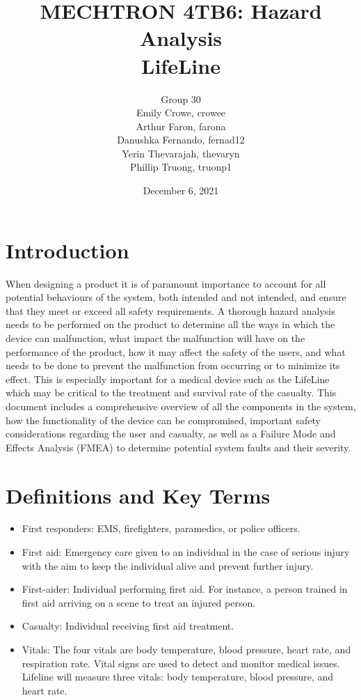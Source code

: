 \documentclass{article}
\title{MECHTRON 4TB6: Hazard Analysis \\ LifeLine}
\author{Group 30 \\ Emily Crowe, crowee \\ Arthur Faron, farona \\ Danushka Fernando, fernad12 \\Yerin Thevarajah, thevaryn \\ Phillip Truong, truonp1}
\begin{document}
\renewcommand{\labelenumii}{\arabic{enumi}.\arabic{enumii}}
\renewcommand{\labelenumiii}{\arabic{enumi}.\arabic{enumii}.\arabic{enumiii}}
\renewcommand{\labelenumiv}{\arabic{enumi}.\arabic{enumii}.\arabic{enumiii}.\arabic{enumiv}}

    \date{December 6, 2021}
	\maketitle
	
	\newpage
    
	\tableofcontents

	\newpage

	\section{Introduction}
	When designing a product it is of paramount importance to account for all potential behaviours of the system, both intended and not intended, and ensure that they meet or exceed all safety requirements. A thorough hazard analysis needs to be performed on the product to determine all the ways in which the device can malfunction, what impact the malfunction will have on the performance of the product, how it may affect the safety of the users, and what needs to be done to prevent the malfunction from occurring or to minimize its effect. This is especially important for a medical device such as the LifeLine which may be critical to the treatment and survival rate of the casualty. This document includes a comprehensive overview of all the components in the system, how the functionality of the device can be compromised, important safety considerations regarding the user and casualty, as well as a Failure Mode and Effects Analysis (FMEA) to determine potential system faults and their severity.
	
	\section{Definitions and Key Terms}
	\begin{itemize}
	    \item First responders: EMS, firefighters, paramedics, or police officers.
	    \item First aid:  Emergency care given to an individual in the case of serious injury with the aim to keep the individual alive and prevent further injury.
	    \item First-aider: Individual performing first aid.  For instance, a person trained in first aid arriving on a scene to treat an injured person.
	    \item Casualty: Individual receiving first aid treatment.
	    \item Vitals: The four vitals are body temperature, blood pressure, heart rate, and respiration rate. Vital signs are used to detect and monitor medical issues.  Lifeline will measure three vitals: body temperature, blood pressure, and heart rate.
	\end{itemize}
	
\end{document}
